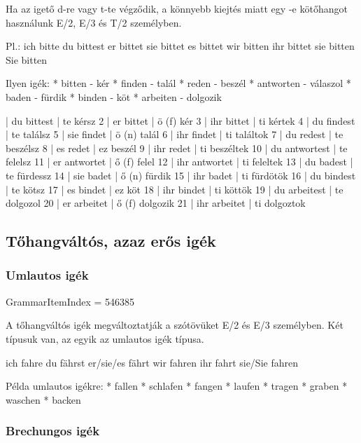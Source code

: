 \documentclass{article}
\newenvironment{desc}{\verbatim}{\endverbatim}
\newenvironment{exmp}{\verbatim}{\endverbatim}
\begin{document}
\begin{desc}
Ha az igető d-re vagy t-te végződik, a könnyebb kiejtés miatt egy -e
kötőhangot használunk E/2, E/3 és T/2 személyben.

Pl.:
ich bitte
du bittest
er bittet
sie bittet
es bittet
wir bitten
ihr bittet
sie bitten
Sie bitten

Ilyen igék:
* bitten - kér
* finden - talál
* reden - beszél
* antworten - válaszol
* baden - fürdik
* binden - köt
* arbeiten - dolgozik
\end{desc}

\begin{exmp}
1 | du bittest | te kérsz
2 | er bittet | ö (f) kér
3 | ihr bittet | ti kértek
4 | du findest | te találsz
5 | sie findet | ö (n) talál
6 | ihr findet | ti találtok
7 | du redest | te beszélsz
8 | es redet | ez beszél
9 | ihr redet | ti beszéltek
10 | du antwortest | te felelsz
11 | er antwortet | ő (f) felel
12 | ihr antwortet | ti feleltek
13 | du badest | te fürdessz
14 | sie badet | ő (n) fürdik
15 | ihr badet | ti fürdötök
16 | du bindest | te kötsz
17 | es bindet | ez köt
18 | ihr bindet | ti köttök
19 | du arbeitest | te dolgozol
20 | er arbeitet | ő (f) dolgozik
21 | ihr arbeitet | ti dolgoztok
\end{exmp}

\subsection{Tőhangváltós, azaz erős igék}

\subsubsection{Umlautos igék}

GrammarItemIndex = 546385

\begin{desc}
A tőhangváltós igék megváltoztatják a szótövüket E/2 és E/3 személyben. Két típusuk van, az egyik az umlautos igék típusa.

ich fahre 
du fährst 
er/sie/es fährt 
wir fahren 
ihr fahrt 
sie/Sie fahren 

Példa umlautos igékre:
* fallen
* schlafen
* fangen
* laufen
* tragen
* graben
* waschen
* backen
\end{desc}

\begin{exmp}
\end{exmp}

\subsubsection{Brechungos igék}
\end{document}
